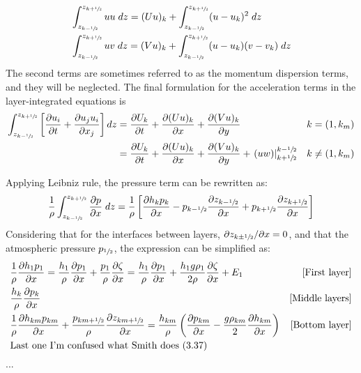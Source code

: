 \begin{align}
    &\int_{z_{k-\sfrac{1}{2}}}^{z_{k+\sfrac{1}{2}}} uu \; dz = (Uu)_k +  \int_{z_{k-\sfrac{1}{2}}}^{z_{k+\sfrac{1}{2}}} (u-u_k)^2 \; dz \notag\\ 
    &\int_{z_{k-\sfrac{1}{2}}}^{z_{k+\sfrac{1}{2}}} uv \; dz = (Vu)_k +  \int_{z_{k-\sfrac{1}{2}}}^{z_{k+\sfrac{1}{2}}} (u-u_k)(v-v_k) \; dz
\end{align}
The second terms are sometimes referred to as the momentum dispersion terms, and they will be neglected. The final formulation for the acceleration terms in the layer-integrated equations is 
\begin{align}
    \int_{z_{k-\sfrac{1}{2}}}^{z_{k+\sfrac{1}{2}}} \left[ \frac{\partial u_i}{\partial t} +  \frac{\partial u_ju_i}{\partial x_j} \right] dz &= \frac{\partial U_k}{\partial t} + \frac{\partial (Uu)_k}{\partial x} + \frac{\partial (Vu)_k}{\partial y}  &k=(1,k_m) \\
    &= \frac{\partial U_k}{\partial t} + \frac{\partial (Uu)_k}{\partial x} + \frac{\partial (Vu)_k}{\partial y} +\left.(uw)\right|^{k-\sfrac{1}{2}}_{k+\sfrac{1}{2}}  &k\neq(1,k_m)
\end{align}

Applying Leibniz rule, the pressure term can be rewritten as:
\begin{equation}
    \frac{1}{\rho} \int_{z_{k-\sfrac{1}{2}}}^{z_{k+\sfrac{1}{2}}} \frac{\partial p}{\partial x}\; dz =  \frac{1}{\rho} \left[ \frac{\partial h_k p_k}{\partial x} - p_{k-\sfrac{1}{2}} \frac{\partial z_{k-\sfrac{1}{2}}}{\partial x} + p_{k+\sfrac{1}{2}}\frac{\partial z_{k+\sfrac{1}{2}}}{\partial x} \right]
\end{equation}
Considering that for the interfaces between layers, $\partial z_{k\pm\sfrac{1}{2}}/\partial x=0$, and that the atmospheric pressure $p_{\sfrac{1}{2}}$, the expression can be simplified as:
\begin{align}
    &\frac{1}{\rho}\frac{\partial h_1 p_1}{\partial x} = \frac{h_1}{\rho}\frac{\partial  p_1}{\partial x} + \frac{p_1}{\rho}\frac{\partial  \zeta}{\partial x}  = \frac{h_1}{\rho}\frac{\partial  p_1}{\partial x} + \frac{h_1 g \rho_1}{2\rho}\frac{\partial  \zeta}{\partial x} + E_1 &\text{[First layer]} \\
    &\frac{h_k}{\rho}\frac{\partial  p_k}{\partial x}  &\text{[Middle layers]} \\
     &\frac{1}{\rho}\frac{\partial h_{km} p_{km}}{\partial x} + \frac{p_{km+\sfrac{1}{2}}}{\rho} \frac{\partial z_{km+\sfrac{1}{2}}}{\partial x} = \frac{h_{km}}{\rho} \left( \frac{\partial p_{km}}{\partial x} - \frac{g\rho_{km}}{2}\frac{\partial h_{km}}{\partial x}\right)  &\text{[Bottom layer]}\\
     &\text{Last one I'm confused what Smith does (3.37)}
\end{align}
...


